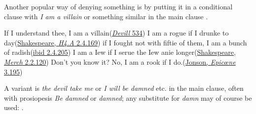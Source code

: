 Another popular way of denying something is by putting it in a conditional clause with \textit{I am a villain} or something similar in the main clause .

\ea \label{ex:04-50}
\ea If I understand thee, I am a villain\hfill(\href{https://archive.org/details/merrydevilofedmo00fabe/page/16/mode/2up?q=\%22If+I+understand+thee%2C+I+am+a+villain\%22&view=theater}{\textit{Devill} 534})
\ex I am a rogue if I drunke to day\hfill(\href{https://internetshakespeare.uvic.ca/doc/1H4_F1/scene/2.4/index.html#tln-1110}{Shakespeare, \textit{H4.A} 2.4.169}) 
\ex if I fought not with fiftie of them, I am a bunch of radish\hfill(\href{https://internetshakespeare.uvic.ca/doc/1H4_F1/scene/2.4/index.html#tln-1140}{ibid 2.4.205}) 
\ex I am a Iew if I serue the Iew anie longer\hfill(\href{https://internetshakespeare.uvic.ca/doc/MV_F1/scene/2.2/index.html#tln-670}{Shakespeare, \textit{Merch} 2.2.120})
\ex Don't you know it? No, I am a rook if I do.\hfill(\href{https://archive.org/details/bim_eighteenth-century_epicne-or-the-silent-_jonson-ben_1776/page/n37/mode/2up?q=\%22No%2C+I+am+a+rook+if+I+do\%22&view=theater}{Jonson, \textit{Epicœne} 3.195})
\z
\z

A variant is \textit{the devil take me} or \textit{I will be damned} etc. in the main clause, often with prosiopesis \textit{Be damned} or \textit{damned}; any substitute for \textit{damn} may of course be used: .\largerpage[2]

